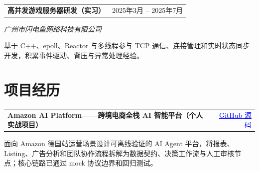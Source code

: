 \documentclass[10pt, a4paper]{article}
\begin{document}
\vspace{2pt}

\noindent
\begin{tabularx}{\textwidth}{@{}X r@{}}
{\fontsize{10}{12}\selectfont\textbf{高并发游戏服务器研发（实习）}} &
{\fontsize{10}{12}\selectfont 2025年3月 -- 2025年7月}
\end{tabularx}

 \hfill {\fontsize{10}{12}\selectfont\textit{广州市闪电鱼网络科技有限公司}}

{\fontsize{9}{12}\selectfont
基于 C++、epoll、Reactor 与多线程参与 TCP 通信、连接管理和实时状态同步开发，积累事件驱动、背压与异常处理经验。
}

\vspace{2pt}

\section{项目经历}

\noindent
\begin{tabularx}{\textwidth}{@{}X r@{}}
{\fontsize{10}{12}\selectfont\textbf{Amazon AI Platform——跨境电商全栈 AI 智能平台（个人实战项目）}} &
{\fontsize{9}{12}\selectfont\href{https://github.com/binn-997/ecommerce-agent-learning}{\textcolor{blue}{\underline{GitHub 源码}}}}
\end{tabularx}


\vspace{1pt}
{\fontsize{9}{12}\selectfont
面向 Amazon 德国站运营场景设计可离线验证的 AI Agent 平台，将报表、Listing、广告分析和团队协作流程拆解为数据契约、决策工作流与人工审核节点；核心链路已通过 mock 协议边界和回归测试。
}
\end{document}
